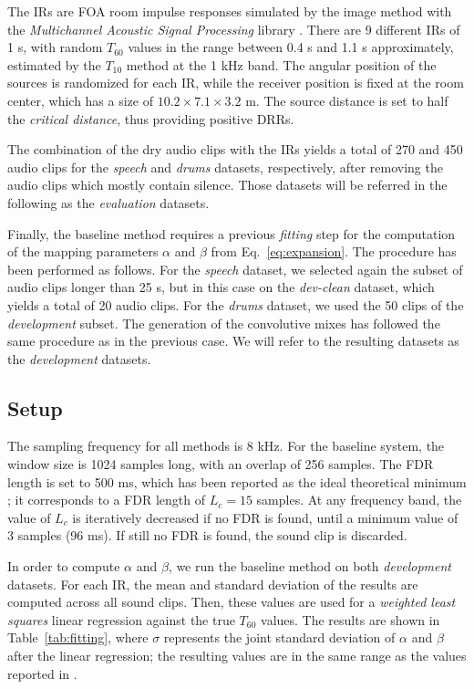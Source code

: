 The IRs are FOA room impulse responses simulated by the image method with the \textit{Multichannel Acoustic Signal Processing} library \cite{masp}. There are 9 different IRs of 1 s, with random $T_{60}$ values in the range between 0.4 s and 1.1 s approximately, estimated by the $T_{10}$ method at the 1 kHz band. The angular position of the sources is randomized for each IR, while the receiver position is fixed at the room center, which has a size of $10.2 \times 7.1 \times 3.2$ m. The source distance is set to half the \textit{critical distance}, thus providing positive DRRs. 

The combination of the dry audio clips with the IRs yields a total of 270 and 450 audio clips for the \textit{speech} and \textit{drums} datasets, respectively, after removing the audio clips which mostly contain silence. Those datasets will be referred in the following as the \textit{evaluation} datasets. 

Finally, the baseline method requires a previous \textit{fitting} step for the computation of the mapping parameters $\alpha$ and $\beta$ from Eq.~\ref{eq:expansion}. The procedure has been performed as follows.
For the \textit{speech} dataset, we selected again the subset of audio clips longer than 25 s, but in this case on the \textit{dev-clean} dataset, which yields a total of 20 audio clips. 
For the \textit{drums} dataset, we used the 50 clips of the \textit{development} subset.
The generation of the convolutive mixes has followed the same procedure as in the previous case. We will refer to the resulting datasets as the \textit{development} datasets. 

\subsection{Setup}
\label{sec:setup}


The sampling frequency for all methods is 8 kHz.
For the baseline system, the window size is 1024 samples long, with an overlap of 256 samples. The FDR length is set to 500 ms, which has been reported as the ideal theoretical minimum \cite{prego2012blind}; it corresponds to a FDR length of $L_c = 15$ samples. 
At any frequency band, the value of $L_c$ is iteratively decreased if no FDR is found, until a minimum value of 3 samples (96 ms). If still no FDR is found, the sound clip is discarded. 

In order to compute $\alpha$ and $\beta$, we run the baseline method on both \textit{development} datasets. For each IR, the mean and standard deviation of the results are computed across all sound clips. Then, these values are used for a \textit{weighted least squares} linear regression against the true $T_{60}$ values.
The results are shown in Table~\ref{tab:fitting}, where $\sigma$ represents the joint standard deviation of $\alpha$ and $\beta$ after the linear regression; 
the resulting values are in the same range as the values reported in \cite{prego2012blind}. 


